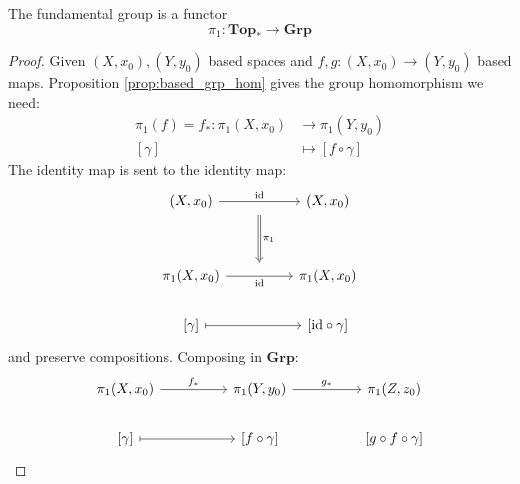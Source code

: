 \begin{theorem}
    The fundamental group is a functor
    \[
      \pi_1: \mathbf{Top}_* \longrightarrow \mathbf{Grp}
    \]
\end{theorem}

\begin{proof}
  Given \( (X, x_0), (Y, y_0) \) based spaces
  and \( f, g: (X, x_0) \to (Y, y_0) \) based maps.
  Proposition \ref{prop:based_grp_hom} gives 
  the group homomorphism we need:
  \begin{align*}
    \pi_1(f) = f_* : \pi_1(X, x_0) &\longrightarrow \pi_1(Y, y_0) \\
    [\gamma] &\longmapsto [f \circ \gamma]
  \end{align*} 
  The identity map is sent to the identity map:
\[\begin{tikzcd}
	{(X,x_0)} && {(X,x_0)} \\
	\\
	{\pi_1(X,x_0)} && {\pi_1(X,x_0)} \\
	{[\gamma]} && {[\text{id} \circ \gamma]}
	\arrow[""{name=0, anchor=center, inner sep=0}, "{\text{id}}", from=1-1, to=1-3]
	\arrow[""{name=1, anchor=center, inner sep=0}, "{\text{id}}"', from=3-1, to=3-3]
	\arrow[maps to, from=4-1, to=4-3]
	\arrow["{\pi_1}", shorten <=9pt, shorten >=9pt, Rightarrow, from=0, to=1]
\end{tikzcd}\]
and preserve compositions. Composing in \( \mathbf{Grp} \):
\[\begin{tikzcd}
	{\pi_1(X, x_0)} && {\pi_1(Y, y_0)} && {\pi_1(Z, z_0)} \\
	{[\gamma]} && {[f \circ \gamma]} && {[g \circ f \circ \gamma]}
	\arrow["{f_*}", from=1-1, to=1-3]
	\arrow["{g_*}", from=1-3, to=1-5]
	\arrow[maps to, from=2-1, to=2-3]

\end{tikzcd}\]
\end{proof}
